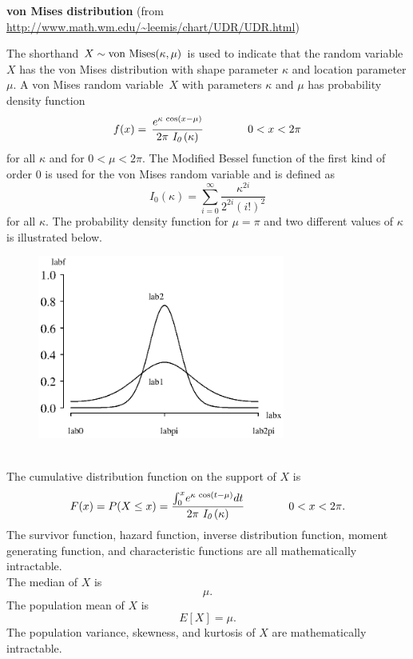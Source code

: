 \documentclass[12pt,fullpage]{article}
\begin{document}
\noindent
{\bf von Mises distribution} (from \color{blue}\url{http://www.math.wm.edu/~leemis/chart/UDR/UDR.html}\color{black})

\noindent
The shorthand $X \sim {\rm von\ Mises}(\kappa, \mu)$ is used to indicate that the
random variable $X$ has the von Mises distribution with shape parameter $\kappa$ and location parameter $\mu$.
A von Mises random variable~$X$ with parameters $\kappa$ and $\mu$ has probability density function 
$$
f(x) = \, {\frac {{e ^ {\kappa \,\cos \left( x - \mu \right) }}}{2 \pi 
\ {\it I_0}  \kern -.08 em \left(\kappa \right) }} \qquad \qquad 0 < x < 2\pi
$$
for all $\kappa$ and for $ 0 < \mu < 2\pi$. The Modified Bessel function of the first kind of order 0
is used for the von Mises random variable and is defined as
$$
I_0 (\kappa) = \displaystyle\sum\limits_{i = 0} ^ {\infty} \frac{\kappa ^ {2i}}{2 ^ {2i} (i !) ^ 2}
$$
for all $\kappa$.
The probability density function for $\mu = \pi$ and two different values of $\kappa$ is illustrated below.
{\begin{figure}[h!]
\begin{center}
\includegraphics[width=3.2in]{VonmisesPlot.ps}
\end{center}
\end{figure}}\\
The cumulative distribution function on
the support of $X$ is
$$
F(x) = P(X \le x) = {\frac {\int _{0} ^ {x} \! {e ^ {\kappa \, \cos \left( t - \mu
 \right) }}{dt}}{2 \pi \ {\it I_0} \kern -.08 em \left(\kappa \right) }} \qquad \qquad 0 < x < 2\pi.
$$
The survivor function, hazard function, inverse distribution function, moment generating function, 
and characteristic functions are all mathematically intractable.
\\
The median of $X$ is
$$
\mu.
$$
The population mean of $X$ is
$$
E[X] = \mu.
$$
The population variance, skewness, and kurtosis of $X$ are mathematically intractable.
\end{document}

